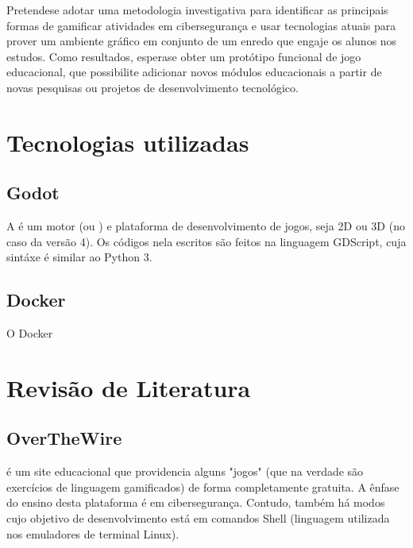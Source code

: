 \documentclass[letterpaper,10pt,portuges]{sphinxmanual}
\begin{document}
\sphinxAtStartPar
Pretende\sphinxhyphen{}se adotar uma metodologia investigativa para identificar as principais formas de gamificar atividades em cibersegurança e usar tecnologias atuais para prover um ambiente gráfico em conjunto de um enredo que engaje os alunos nos estudos. Como resultados, espera\sphinxhyphen{}se obter um protótipo funcional de jogo educacional, que possibilite adicionar novos módulos educacionais a partir de novas pesquisas ou projetos de desenvolvimento tecnológico.

\sphinxAtStartPar
{}

\sphinxstepscope


\chapter{Tecnologias utilizadas}
\label{\detokenize{techs:tecnologias-utilizadas}}\label{\detokenize{techs::doc}}

\section{Godot}
\label{\detokenize{techs:id1}}
\sphinxAtStartPar
A  é um motor (ou ) e plataforma  de desenvolvimento de jogos, seja 2D ou 3D (no caso da versão 4). Os códigos nela escritos são feitos na linguagem GDScript, cuja sintáxe é similar ao Python 3.


\section{Docker}
\label{\detokenize{techs:id2}}
\sphinxAtStartPar
O Docker

\sphinxstepscope


\chapter{Revisão de Literatura}
\label{\detokenize{lit_rev:revisao-de-literatura}}\label{\detokenize{lit_rev::doc}}

\section{OverTheWire}
\label{\detokenize{lit_rev:id1}}
\sphinxAtStartPar
{} é um site educacional que providencia alguns "jogos" (que na verdade são exercícios de linguagem gamificados) de forma completamente gratuita. A ênfase do ensino desta plataforma é em cibersegurança. Contudo, também há modos cujo objetivo de desenvolvimento está em comandos Shell (linguagem utilizada nos emuladores de terminal Linux).
\end{document}
